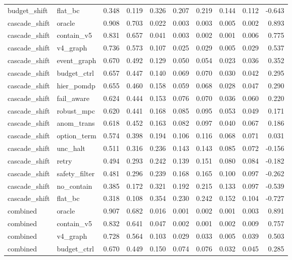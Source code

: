 \documentclass{article}
\begin{document}
\begin{longtable}{@{}llrrrrrrrr@{}}
budget\_shift & flat\_bc & 0.348 & 0.119 & 0.326 & 0.207 & 0.219 & 0.144 & 0.112 & -0.643 \\
cascade\_shift & oracle & 0.908 & 0.703 & 0.022 & 0.003 & 0.003 & 0.005 & 0.002 & 0.893 \\
cascade\_shift & contain\_v5 & 0.831 & 0.657 & 0.041 & 0.003 & 0.002 & 0.001 & 0.006 & 0.775 \\
cascade\_shift & v4\_graph & 0.736 & 0.573 & 0.107 & 0.025 & 0.029 & 0.005 & 0.029 & 0.537 \\
cascade\_shift & event\_graph & 0.670 & 0.492 & 0.129 & 0.050 & 0.054 & 0.023 & 0.036 & 0.352 \\
cascade\_shift & budget\_ctrl & 0.657 & 0.447 & 0.140 & 0.069 & 0.070 & 0.030 & 0.042 & 0.295 \\
cascade\_shift & hier\_pomdp & 0.655 & 0.460 & 0.158 & 0.059 & 0.068 & 0.028 & 0.047 & 0.290 \\
cascade\_shift & fail\_aware & 0.624 & 0.444 & 0.153 & 0.076 & 0.070 & 0.036 & 0.060 & 0.220 \\
cascade\_shift & robust\_mpc & 0.620 & 0.441 & 0.168 & 0.085 & 0.095 & 0.053 & 0.049 & 0.171 \\
cascade\_shift & anom\_trans & 0.618 & 0.452 & 0.163 & 0.082 & 0.097 & 0.040 & 0.067 & 0.186 \\
cascade\_shift & option\_term & 0.574 & 0.398 & 0.194 & 0.106 & 0.116 & 0.068 & 0.071 & 0.031 \\
cascade\_shift & unc\_halt & 0.511 & 0.316 & 0.236 & 0.143 & 0.143 & 0.085 & 0.072 & -0.156 \\
cascade\_shift & retry & 0.494 & 0.293 & 0.242 & 0.139 & 0.151 & 0.080 & 0.084 & -0.182 \\
cascade\_shift & safety\_filter & 0.481 & 0.296 & 0.239 & 0.168 & 0.165 & 0.100 & 0.097 & -0.262 \\
cascade\_shift & no\_contain & 0.385 & 0.172 & 0.321 & 0.192 & 0.215 & 0.133 & 0.097 & -0.539 \\
cascade\_shift & flat\_bc & 0.318 & 0.108 & 0.354 & 0.230 & 0.242 & 0.152 & 0.104 & -0.727 \\
combined & oracle & 0.907 & 0.682 & 0.016 & 0.001 & 0.002 & 0.001 & 0.003 & 0.891 \\
combined & contain\_v5 & 0.832 & 0.641 & 0.047 & 0.002 & 0.001 & 0.002 & 0.009 & 0.757 \\
combined & v4\_graph & 0.728 & 0.564 & 0.103 & 0.029 & 0.033 & 0.005 & 0.039 & 0.503 \\
combined & budget\_ctrl & 0.670 & 0.449 & 0.150 & 0.074 & 0.076 & 0.032 & 0.045 & 0.285 \\

\end{longtable}
\end{document}
